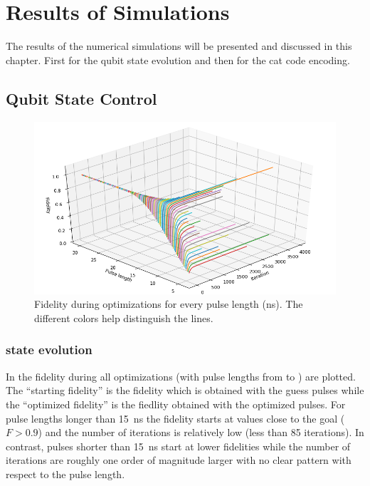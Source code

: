 \documentclass[main.tex]{subfiles}
\begin{document}
\chapter{Results of Simulations}
The results of the numerical simulations will be presented and discussed in this chapter.
First for the qubit state evolution and then for the cat code encoding.

\section{Qubit State Control}
\begin{figure}[H]
    \centering
    \includegraphics[width=\linewidth]{figs/3d-optim-ge.png}
    \caption{Fidelity during optimizations for every pulse length (ns). The different colors help distinguish the lines.}\label{fig:3d-optim-ge}
\end{figure}
\subsection{%
	\texorpdfstring{}{0 -> 1} state evolution
}

In  the fidelity during all optimizations (with pulse lengths from  to ) are plotted.
The ``starting fidelity'' is the fidelity which is obtained with the guess pulses while the ``optimized fidelity'' is the fiedlity obtained with the optimized pulses.
For pulse lengths longer than \SI{15}{\nano\second} the fidelity starts at values close to the goal (\(F>0.9\)) and the number of iterations is relatively low (less than 85 iterations).
In contrast, pulses shorter than \SI{15}{\nano\second} start at lower fidelities while the number of iterations are roughly one order of magnitude larger with no clear pattern with respect to the pulse length.
\end{document}
